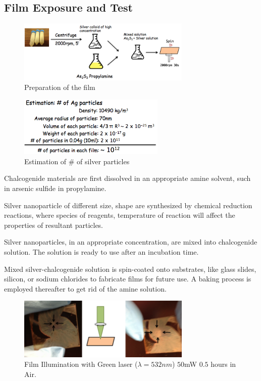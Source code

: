 \documentclass[twocolumn,showpacs,preprintnumbers,amsmath,amssymb]{revtex4}
\begin{document}
\subsection{Film Exposure and Test}
\begin{figure}[!h]
  \includegraphics[width=3.25in]{figure/Film.png}
  \caption{Preparation of the film}
  \label{fig:setup}
\end{figure}

\begin{figure}[!h]
  \includegraphics[width=2.75in]{figure/SilverNumber.png}
  \caption{Estimation of \# of silver particles}
  \label{fig:setup}
\end{figure}

Chalcogenide materials are first dissolved in an appropriate amine
solvent, such in arsenic sulfide in propylamine.

Silver nanoparticle of different size, shape are synthesized by
chemical reduction reactions, where species of reagents, temperature
of reaction will affect the properties of resultant particles.

Silver nanoparticles, in an appropriate concentration, are mixed into
chalcogenide solution. The solution is ready to use after an
incubation time.

Mixed silver-chalcogenide solution is spin-coated onto substrates,
like glass slides, silicon, or sodium chlorides to fabricate films for
future use. A baking process is employed thereafter to get rid of the
amine solution.


\begin{figure}[!h]
  \includegraphics[width=3.25in]{figure/Exposure1.png}
  \caption{Film Illumination with Green laser ($\lambda = 532nm$)
    $50$mW $0.5$ hours in Air.}
  \label{fig:setup}
\end{figure}
\end{document}
